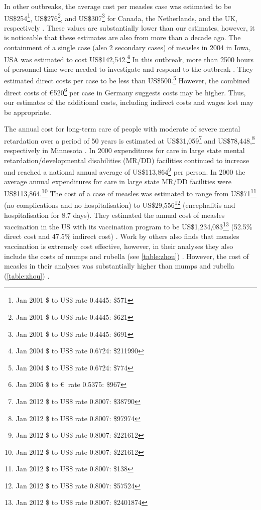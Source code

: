 \documentclass{article}
\begin{document}
In other outbreaks, the average cost per measles case was estimated to be US\$254\footnote{Jan 2001 \$ to US\$ rate 0.4445: \$571}, US\$276\footnote{Jan 2001 \$ to US\$ rate 0.4445: \$621}, and US\$307\footnote{Jan 2001 \$ to US\$ rate 0.4445: \$691} for Canada, the Netherlands, and the UK, respectively  \citep{carabin2}. These values are substantially lower than our estimates, however, it is noticeable that these estimates are also from more than a decade ago. The containment of a single case (also 2 secondary cases) of measles in 2004 in Iowa, USA was estimated to cost US\$142,542.\footnote{Jan 2004 \$ to US\$ rate 0.6724: \$211990} In this outbreak, more than 2500 hours of personnel time were needed to investigate and respond to the outbreak \citep{dayan5}. They estimated direct costs per case to be less than US\$500.\footnote{Jan 2004 \$ to US\$ rate 0.6724: \$774} However, the combined direct costs of \euro 520\footnote{Jan 2005 \$ to \euro\ rate 0.5375: \$967} per case in Germany \citep{siedler6} suggests costs may be higher. Thus, our estimates of the additional costs, including indirect costs and wages lost may be appropriate.

The annual cost for long-term care of people with moderate of severe mental retardation over a period of 50 years is estimated at US\$31,059\footnote{Jan 2012 \$ to US\$ rate 0.8007: \$38790} and US\$78,448,\footnote{Jan 2012 \$ to US\$ rate 0.8007: \$97974} respectively in Minnesota \citep{prouty1}. In 2000 expenditures for care in large state mental retardation/developmental disabilities (MR/DD) facilities continued to increase and reached a national annual average of US\$113,864\footnote{Jan 2012 \$ to US\$ rate 0.8007: \$221612} per person. In 2000 the average annual expenditures for care in large state MR/DD facilities were US\$113,864.\footnote{Jan 2012 \$ to US\$ rate 0.8007: \$221612} The cost of a case of measles was estimated to range from US\$71\footnote{Jan 2012 \$ to US\$ rate 0.8007: \$138} (no complications and no hospitalisation) to US\$29,556\footnote{Jan 2012 \$ to US\$ rate 0.8007: \$57524} (encephalitis and hospitalisation for 8.7 days). They estimated the annual cost of measles vaccination in the US with its vaccination program to be US\$1,234,083\footnote{Jan 2012 \$ to US\$ rate 0.8007: \$2401874} (52.5\% direct cost and 47.5\% indirect cost) \citep{zhou4}. Work by others also finds that measles vaccination is extremely cost effective, however, in their analyses they also include the costs of mumps and rubella (see \autoref{table:zhou}) \citep{zhou4}. However, the cost of measles in their analyses was substantially higher than mumps and rubella (\autoref{table:zhou}) \citep{zhou4}.
\end{document}
